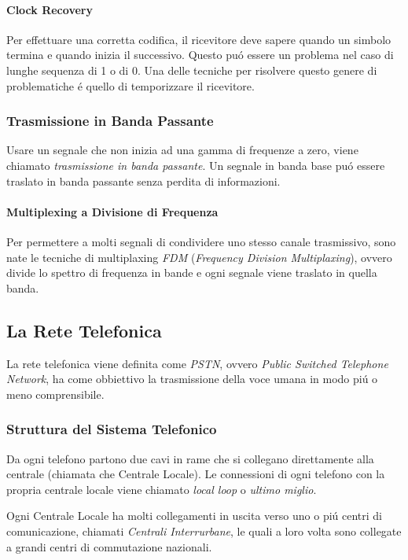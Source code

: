 \documentclass[12pt]{article}
\begin{document}
\paragraph{Clock Recovery} Per effettuare una corretta codifica, il ricevitore deve sapere quando un simbolo termina 
e quando inizia il successivo. Questo pu\'o essere un problema nel caso di lunghe sequenza di 1 o di 0. Una delle 
tecniche per risolvere questo genere di problematiche \'e quello di temporizzare il ricevitore.


\subsubsection{Trasmissione in Banda Passante}
Usare un segnale che non inizia ad una gamma di frequenze a zero, viene chiamato \textit{trasmissione in banda 
passante}. Un segnale in banda base pu\'o essere traslato in banda passante senza perdita di informazioni.

\paragraph{Multiplexing a Divisione di Frequenza} Per permettere a molti segnali di condividere uno stesso canale 
trasmissivo, sono nate le tecniche di multiplaxing \textit{FDM} (\textit{Frequency Division Multiplaxing}), ovvero 
divide lo spettro di frequenza in bande e ogni segnale viene traslato in quella banda.


\subsection{La Rete Telefonica}
La rete telefonica viene definita come \textit{PSTN}, ovvero \textit{Public Switched Telephone Network}, ha come 
obbiettivo la trasmissione della voce umana in modo pi\'u o meno comprensibile.

\subsubsection{Struttura del Sistema Telefonico}
Da ogni telefono partono due cavi in rame che si collegano direttamente alla centrale (chiamata che Centrale Locale).
Le connessioni di ogni telefono con la propria centrale locale viene chiamato \textit{local loop} o \textit{ultimo
miglio}.

Ogni Centrale Locale ha molti collegamenti in uscita verso uno o pi\'u centri di comunicazione, chiamati
\textit{Centrali Interrurbane}, le quali a loro volta sono collegate a grandi centri di commutazione nazionali.
\end{document}
